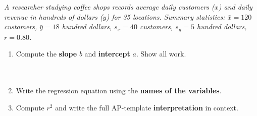 \documentclass[10pt]{article}
\begin{document}
\namedateperiod

\vspace{0.18in}

\begin{tcolorbox}[colback=sky, colframe=navy, boxrule=0.9pt, arc=2mm,
    left=4mm, right=4mm, top=2.5mm, bottom=2.5mm]
\small\textit{A researcher studying coffee shops records average daily customers ($x$) and
daily revenue in hundreds of dollars ($y$) for 35 locations.
Summary statistics: $\bar{x} = 120$ customers, $\bar{y} = 18$ hundred dollars,
$s_x = 40$ customers, $s_y = 5$ hundred dollars, $r = 0.80$.}
\end{tcolorbox}

\vspace{0.16in}

\begin{enumerate}[leftmargin=1.6em, itemsep=0.16in]

  \item Compute the \textbf{slope} $b$ and \textbf{intercept} $a$. Show all work.\\[8pt]
        \writeline\\[3pt]\writeline\\[3pt]\writeline

  \item Write the regression equation using the \textbf{names of the variables}.\\[8pt]
        \writeline

  \item Compute $r^2$ and write the full AP-template \textbf{interpretation} in context.\\[8pt]
        \writeline\\[3pt]\writeline\\[3pt]\writeline

\end{enumerate}

\vspace{0.14in}
\end{document}
